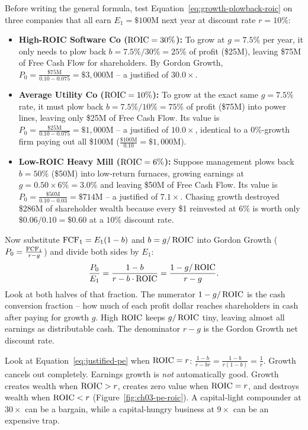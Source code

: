 Before writing the general  formula, test Equation~\eqref{eq:growth-plowback-roic} on three companies that all earn $E_1 = \$100\text{M}$ next year at discount rate $r = 10\%$:
\begin{itemize}
 \item \textbf{High-ROIC Software Co ($\operatorname{ROIC} = 30\%$):} To grow at $g = 7.5\%$ per year, it only needs to plow back $b = 7.5\% / 30\% = 25\%$ of profit (\$25M), leaving \$75M of Free Cash Flow for shareholders. By Gordon Growth, $P_0 = \frac{\$75\text{M}}{0.10 - 0.075} = \$3{,}000\text{M}$ -- a justified  of $\mathbf{30.0\times}$.
 \item \textbf{Average Utility Co ($\operatorname{ROIC} = 10\%$):} To grow at the exact same $g = 7.5\%$ rate, it must plow back $b = 7.5\% / 10\% = 75\%$ of profit (\$75M) into power lines, leaving only \$25M of Free Cash Flow. Its value is $P_0 = \frac{\$25\text{M}}{0.10 - 0.075} = \$1{,}000\text{M}$ -- a justified  of $\mathbf{10.0\times}$, identical to a $0\%$-growth firm paying out all \$100M ($\frac{\$100\text{M}}{0.10} = \$1{,}000\text{M}$).
 \item \textbf{Low-ROIC Heavy Mill ($\operatorname{ROIC} = 6\%$):} Suppose management plows back $b = 50\%$ (\$50M) into low-return furnaces, growing earnings at $g = 0.50 \times 6\% = 3.0\%$ and leaving \$50M of Free Cash Flow. Its value is $P_0 = \frac{\$50\text{M}}{0.10 - 0.03} = \$714\text{M}$ -- a justified  of $\mathbf{7.1\times}$. Chasing growth destroyed \$286M of shareholder wealth because every \$1 reinvested at $6\%$ is worth only $\$0.06 / 0.10 = \$0.60$ at a $10\%$ discount rate.
\end{itemize}

Now substitute $\operatorname{FCF}_1 = E_1(1 - b)$ and $b = g / \operatorname{ROIC}$ into Gordon Growth ($P_0 = \frac{\operatorname{FCF}_1}{r - g}$) and divide both sides by $E_1$:
\begin{equation}
 \frac{P_0}{E_1} = \frac{1 - b}{r - b \cdot \operatorname{ROIC}} = \frac{1 - g / \operatorname{ROIC}}{r - g}.
 \label{eq:justified-pe}
\end{equation}
Look at both halves of that fraction. The numerator $1 - g / \operatorname{ROIC}$ is the cash conversion fraction -- how much of each profit dollar reaches shareholders in cash after paying for growth $g$. High $\operatorname{ROIC}$ keeps $g / \operatorname{ROIC}$ tiny, leaving almost all earnings as distributable cash. The denominator $r - g$ is the Gordon Growth net discount rate.

\begin{intuitionbox}
Look at Equation~\eqref{eq:justified-pe} when $\operatorname{ROIC} = r$: $\frac{1 - b}{r - br} = \frac{1-b}{r(1-b)} = \frac{1}{r}$. Growth cancels out completely. Earnings growth is \emph{not} automatically good. Growth creates wealth when $\operatorname{ROIC} > r$, creates zero value when $\operatorname{ROIC} = r$, and destroys wealth when $\operatorname{ROIC} < r$ (Figure~\ref{fig:ch03-pe-roic}). A capital-light compounder at $30\times$  can be a bargain, while a capital-hungry business at $9\times$  can be an expensive trap.
\end{intuitionbox}


